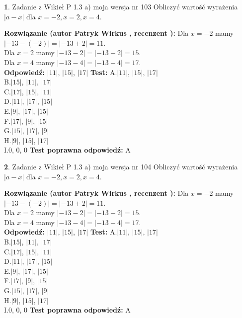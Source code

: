 \documentclass[12pt, a4paper]{article}
\theoremstyle{definition} %
\newtheorem{zad}{}
\newcommand{\zadStart}[1]{\begin{zad}#1\newline}
\newcommand{\zadStop}{\end{zad}}
\newcommand{\rozwStart}[2]{\noindent \textbf{Rozwiązanie (autor #1 , recenzent #2): }\newline}
\newcommand{\rozwStop}{\newline}
\newcommand{\odpStart}{\noindent \textbf{Odpowiedź:}\newline}
\newcommand{\odpStop}{\newline}
\newcommand{\testStart}{\noindent \textbf{Test:}\newline}
\newcommand{\testStop}{\newline}
\newcommand{\kluczStart}{\noindent \textbf{Test poprawna odpowiedź:}\newline}
\newcommand{\kluczStop}{\newline}
\begin{document}
\zadStart{Zadanie z Wikieł P 1.3 a) moja wersja nr 103}
Obliczyć wartość wyrażenia $|a - x|$ dla $x=-2,x=2,x=4$.
\zadStop
\rozwStart{Patryk Wirkus}{}
Dla $x = -2$ mamy $|-13 - (-2)| = |-13 + 2| = 11$.\\
Dla $x = 2$ mamy $|-13 - 2| = |-13 - 2| = 15$.\\
Dla $x = 4$ mamy $|-13 - 4| = |-13 - 4| = 17$.\\
\rozwStop
\odpStart
$|11|$, $|15|$, $|17|$
\odpStop
\testStart
A.$|11|$, $|15|$, $|17|$\\
B.$|15|$, $|11|$, $|17|$\\
C.$|17|$, $|15|$, $|11|$\\
D.$|11|$, $|17|$, $|15|$\\
E.$|9|$, $|17|$, $|15|$\\
F.$|17|$, $|9|$, $|15|$\\
G.$|15|$, $|17|$, $|9|$\\
H.$|9|$, $|15|$, $|17|$\\
I.$0$, $0$, $0$
\testStop
\kluczStart
A
\kluczStop



\zadStart{Zadanie z Wikieł P 1.3 a) moja wersja nr 104}
Obliczyć wartość wyrażenia $|a - x|$ dla $x=-2,x=2,x=4$.
\zadStop
\rozwStart{Patryk Wirkus}{}
Dla $x = -2$ mamy $|-13 - (-2)| = |-13 + 2| = 11$.\\
Dla $x = 2$ mamy $|-13 - 2| = |-13 - 2| = 15$.\\
Dla $x = 4$ mamy $|-13 - 4| = |-13 - 4| = 17$.\\
\rozwStop
\odpStart
$|11|$, $|15|$, $|17|$
\odpStop
\testStart
A.$|11|$, $|15|$, $|17|$\\
B.$|15|$, $|11|$, $|17|$\\
C.$|17|$, $|15|$, $|11|$\\
D.$|11|$, $|17|$, $|15|$\\
E.$|9|$, $|17|$, $|15|$\\
F.$|17|$, $|9|$, $|15|$\\
G.$|15|$, $|17|$, $|9|$\\
H.$|9|$, $|15|$, $|17|$\\
I.$0$, $0$, $0$
\testStop
\kluczStart
A
\kluczStop
\end{document}
